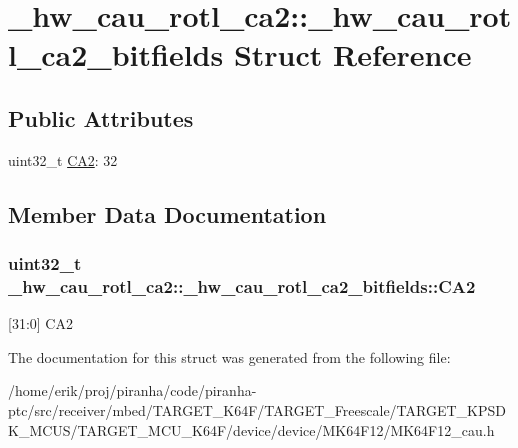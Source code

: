 \hypertarget{struct__hw__cau__rotl__ca2_1_1__hw__cau__rotl__ca2__bitfields}{}\section{\+\_\+hw\+\_\+cau\+\_\+rotl\+\_\+ca2\+:\+:\+\_\+hw\+\_\+cau\+\_\+rotl\+\_\+ca2\+\_\+bitfields Struct Reference}
\label{struct__hw__cau__rotl__ca2_1_1__hw__cau__rotl__ca2__bitfields}
\subsection*{Public Attributes}
\begin{DoxyCompactItemize}
\item 
uint32\+\_\+t \hyperlink{struct__hw__cau__rotl__ca2_1_1__hw__cau__rotl__ca2__bitfields_ab3596b11e36545b3857e1316e9c995f0}{C\+A2}\+: 32
\end{DoxyCompactItemize}


\subsection{Member Data Documentation}
\subsubsection[{\texorpdfstring{C\+A2}{CA2}}]{\setlength{\rightskip}{0pt plus 5cm}uint32\+\_\+t \+\_\+hw\+\_\+cau\+\_\+rotl\+\_\+ca2\+::\+\_\+hw\+\_\+cau\+\_\+rotl\+\_\+ca2\+\_\+bitfields\+::\+C\+A2}\hypertarget{struct__hw__cau__rotl__ca2_1_1__hw__cau__rotl__ca2__bitfields_ab3596b11e36545b3857e1316e9c995f0}{}\label{struct__hw__cau__rotl__ca2_1_1__hw__cau__rotl__ca2__bitfields_ab3596b11e36545b3857e1316e9c995f0}
\mbox{[}31\+:0\mbox{]} C\+A2 

The documentation for this struct was generated from the following file\+:\begin{DoxyCompactItemize}
\item 
/home/erik/proj/piranha/code/piranha-\/ptc/src/receiver/mbed/\+T\+A\+R\+G\+E\+T\+\_\+\+K64\+F/\+T\+A\+R\+G\+E\+T\+\_\+\+Freescale/\+T\+A\+R\+G\+E\+T\+\_\+\+K\+P\+S\+D\+K\+\_\+\+M\+C\+U\+S/\+T\+A\+R\+G\+E\+T\+\_\+\+M\+C\+U\+\_\+\+K64\+F/device/device/\+M\+K64\+F12/M\+K64\+F12\+\_\+cau.\+h\end{DoxyCompactItemize}

